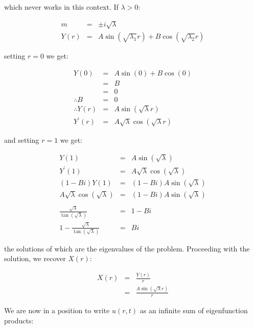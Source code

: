 \documentclass{report}
\begin{document}
which never works in this context. If $\lambda > 0$:\bigskip

\begin{eqnarray*} 
   m & = & \pm i \sqrt{\lambda} \\
Y(r) & = & A \sin(\sqrt{\lambda_1}r) + B \cos(\sqrt{\lambda_2}r)
\end{eqnarray*}\medskip

setting $r = 0$ we get:\bigskip

\begin{eqnarray*} 
           Y(0) & = & A \sin(0) + B \cos(0) \\
                & = & B \\
                & = & 0 \\
   \therefore B & = & 0 \\
\therefore Y(r) & = & A \sin(\sqrt{\lambda}r) \\
  Y^{\prime}(r) & = & A \sqrt{\lambda} \cos(\sqrt{\lambda}r) 
\end{eqnarray*}\medskip

and setting $r = 1$ we get:\bigskip

\begin{eqnarray*} 
                                           Y(1) & = & A \sin(\sqrt{\lambda}) \\
                                  Y^{\prime}(1) & = & A \sqrt{\lambda} \cos(\sqrt{\lambda}) \\
                                   (1 - Bi)Y(1) & = & (1 - Bi) A \sin(\sqrt{\lambda}) \\
          A \sqrt{\lambda} \cos(\sqrt{\lambda}) & = & (1 - Bi) A \sin(\sqrt{\lambda}) \\\\
    \frac{\sqrt{\lambda}}{\tan(\sqrt{\lambda})} & = & 1 - Bi \\
1 - \frac{\sqrt{\lambda}}{\tan(\sqrt{\lambda})} & = & Bi 
\end{eqnarray*}\medskip

the solutions of which are the eigenvalues of the problem. Proceeding with the 
solution, we recover $X(r)$:\bigskip

\begin{eqnarray*} 
X(r) & = & \frac{Y(r)}{r} \\
     & = & \frac{A \sin(\sqrt{\lambda}r)}{r} 
\end{eqnarray*}\medskip

We are now in a position to write $u(r, t)$ as an infinite sum of eigenfunction products:\bigskip
\end{document}
